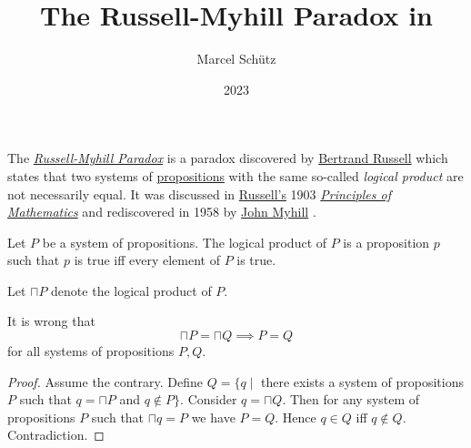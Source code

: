 \documentclass[english]{article}
\begin{document}
\title{The Russell-Myhill Paradox in \Naproche}
\author{Marcel Schütz}
\date{2023}
\maketitle

\noindent The \href{https://en.wikipedia.org/wiki/John_Myhill#Contributions}{\emph{Russell-Myhill Paradox}} is a paradox discovered by \href{https://en.wikipedia.org/wiki/Bertrand_Russell}{Bertrand Russell} which states that two systems of \href{https://en.wikipedia.org/wiki/Proposition}{propositions} with the same so-called \emph{logical product} are not necessarily equal.
It was discussed in \href{https://en.wikipedia.org/wiki/Bertrand_Russell}{Russell's} 1903 \href{https://en.wikipedia.org/wiki/The_Principles_of_Mathematics}{\emph{Principles of Mathematics}} \cite[Appendix B]{Russell1903} and rediscovered in 1958 by \href{https://en.wikipedia.org/wiki/John_Myhill}{John Myhill} \cite{Myhill1958}.

\begin{forthel}

  \begin{signature*}
    Let $P$ be a system of propositions.
    The logical product of $P$ is a proposition $p$ such that $p$ is true iff every element of $P$ is true.
  \end{signature*}

  Let $\sqcap P$ denote the logical product of $P$.

  \begin{theorem*}\label{russell_myhill_paradox}
    It is wrong that
    \[ \sqcap P = \sqcap Q \implies P = Q \]
    for all systems of propositions $P, Q$.
  \end{theorem*}
  \begin{proof}
    Assume the contrary.
    Define $Q = \{ q \mid$ there exists a system of propositions $P$ such that $q = \sqcap P$ and $q \notin P \}$.
    Consider $q = \sqcap Q$.
    Then for any system of propositions $P$ such that $\sqcap q = P$ we have $P = Q$.
    Hence $q \in Q$ iff $q \notin Q$.
    Contradiction.
  \end{proof}
\end{forthel}

\printbibliography
\vfill
\doclicenseThis
\end{document}
